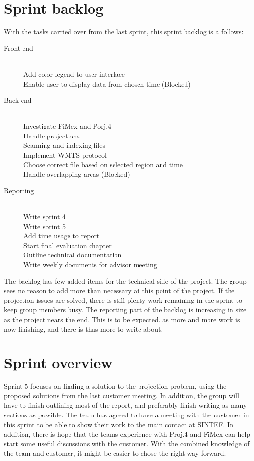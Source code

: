 \documentclass[11pt,a4paper,titlepage,oneside]{report}
\begin{document}
\section{Sprint backlog}
With the tasks carried over from the last sprint, this sprint backlog is a follows:

\begin{description}
	\item[Front end] \hfill \\
	Add color legend to user interface \hfill \\
	Enable user to display data from chosen time (Blocked)
	\item[Back end] \hfill \\
	Investigate FiMex and Porj.4 \hfill \\
	Handle projections \hfill \\
	Scanning and indexing files \hfill \\
	Implement WMTS protocol \hfill \\
	Choose correct file based on selected region and time \hfill \\
	Handle overlapping areas (Blocked)
	\item[Reporting] \hfill \\
	Write sprint 4 \hfill \\
	Write sprint 5 \hfill \\
	Add time usage to report \hfill \\
	Start final evaluation chapter \hfill \\
	Outline technical documentation \hfill \\
	Write weekly documents for advisor meeting
\end{description}

The backlog has few added items for the technical side of the project. The group sees no reason to add more than necessary at this point of the project. If the projection issues are solved, there is still plenty work remaining in the sprint to keep group members busy. The reporting part of the backlog is increasing in size as the project nears the end. This is to be expected, as more and more work is now finishing, and there is thus more to write about. 

\section{Sprint overview}
Sprint 5 focuses on finding a solution to the projection problem, using the proposed solutions from the last customer meeting. In addition, the group will have to finish outlining most of the report, and preferably finish writing as many sections as possible. The team has agreed to have a meeting with the customer in this sprint to be able to show their work to the main contact at SINTEF. In addition, there is hope that the teams experience with Proj.4 and FiMex can help start some useful discussions with the customer. With the combined knowledge of the team and customer, it might be easier to chose the right way forward. 
\end{document}

